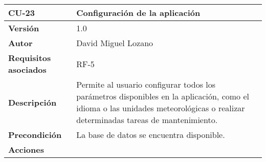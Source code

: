 \begin{longtable}[H]{@{}ll@{}}
\toprule
\begin{minipage}[b]{0.26\columnwidth}\raggedright\strut
\textbf{CU-23}\strut
\end{minipage} & \begin{minipage}[b]{0.68\columnwidth}\raggedright\strut
\textbf{Configuración de la aplicación}\strut
\end{minipage}\tabularnewline
\midrule
\endhead
\begin{minipage}[t]{0.26\columnwidth}\raggedright\strut
\textbf{Versión}\strut
\end{minipage} & \begin{minipage}[t]{0.68\columnwidth}\raggedright\strut
1.0\strut
\end{minipage}\tabularnewline
\begin{minipage}[t]{0.26\columnwidth}\raggedright\strut
\textbf{Autor}\strut
\end{minipage} & \begin{minipage}[t]{0.68\columnwidth}\raggedright\strut
David Miguel Lozano\strut
\end{minipage}\tabularnewline
\begin{minipage}[t]{0.26\columnwidth}\raggedright\strut
\textbf{Requisitos asociados}\strut
\end{minipage} & \begin{minipage}[t]{0.68\columnwidth}\raggedright\strut
RF-5\strut
\end{minipage}\tabularnewline
\begin{minipage}[t]{0.26\columnwidth}\raggedright\strut
\textbf{Descripción}\strut
\end{minipage} & \begin{minipage}[t]{0.68\columnwidth}\raggedright\strut
Permite al usuario configurar todos los parámetros disponibles en la
aplicación, como el idioma o las unidades meteorológicas o realizar
determinadas tareas de mantenimiento.\strut
\end{minipage}\tabularnewline
\begin{minipage}[t]{0.26\columnwidth}\raggedright\strut
\textbf{Precondición}\strut
\end{minipage} & \begin{minipage}[t]{0.68\columnwidth}\raggedright\strut
La base de datos se encuentra disponible.\strut
\end{minipage}\tabularnewline
\begin{minipage}[t]{0.26\columnwidth}\raggedright\strut
\textbf{Acciones}\strut

\end{minipage}
\end{longtable}
